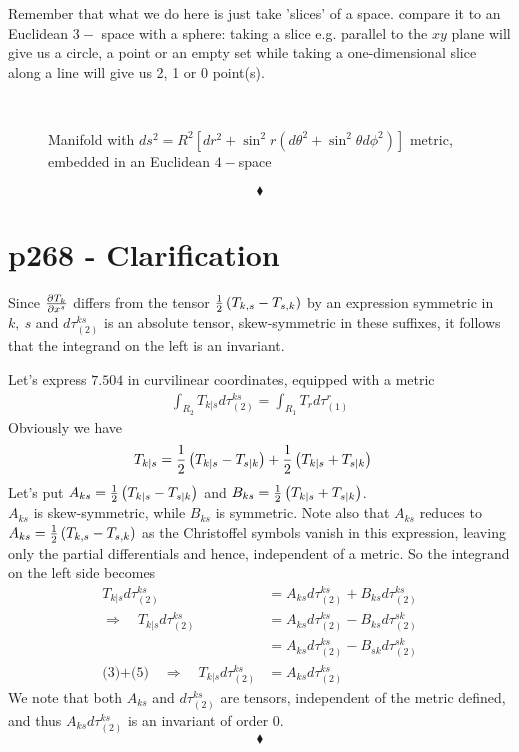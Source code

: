 Remember that what we do here is just take 'slices' of a space. compare it to an Euclidean $3-$ space with a sphere: taking a slice e.g. parallel to the $xy$ plane will give us a circle, a point or an empty set while taking a one-dimensional slice along a line will give us 2, 1 or 0 point(s). 

\begin{figure}[H]%
    \centering
    \subfloat[]{}\\
    \subfloat[]{}
\caption{Manifold with $ds^2=R^2\left[dr^2+\sin^2 r\left(d\theta^2+\sin^2\theta d\phi^2\right)\right]$ metric, embedded in an Euclidean $4-$space}
\label{fig:fig_p265}
\end{figure}
$$\blacklozenge$$
\newpage



\section{p268 - Clarification }
\begin{tcolorbox}
Since $\pdv{T_k}{x^s}$ differs from the tensor $\frac{1}{2}\left(T_{k,s}-T_{s,k}\right)$ by an expression symmetric in $k, \ s$ and $d\tau_{(2)}^{ks}$ is an absolute tensor, skew-symmetric in these suffixes, it follows that the integrand on the left is an invariant.
\end{tcolorbox}
Let's express $\mathbf{7.504}$ in curvilinear coordinates, equipped with a metric
\begin{align}
\int_{R_2}T_{k|s}d\tau_{(2)}^{ks} = \int_{R_1}T_{r}d\tau_{(1)}^{r}
\end{align}
Obviously we have 
\begin{align}
T_{k|s}&= \frac{1}{2}\left(T_{k|s}-T_{s|k}\right)+\frac{1}{2}\left(T_{k|s}+T_{s|k}\right)
\end{align}
Let's put $A_{ks}= \frac{1}{2}\left(T_{k|s}-T_{s|k}\right)$ and $B_{ks}= \frac{1}{2}\left(T_{k|s}+T_{s|k}\right)$.\\
$A_{ks}$ is skew-symmetric, while $B_{ks}$ is symmetric.
Note also that $A_{ks}$ reduces to $A_{ks}=\frac{1}{2}\left(T_{k,s}-T_{s,k}\right)$ as the Christoffel symbols vanish in this expression, leaving only the partial differentials and hence, independent of a metric. 
So the integrand  on the left side becomes
\begin{align}
T_{k|s}d\tau_{(2)}^{ks} &= A_{ks}d\tau_{(2)}^{ks}+B_{ks}d\tau_{(2)}^{ks}\\
\Rightarrow\quad T_{k|s}d\tau_{(2)}^{ks} &= A_{ks}d\tau_{(2)}^{ks}-B_{ks}d\tau_{(2)}^{sk}\\
&= A_{ks}d\tau_{(2)}^{ks}-B_{sk}d\tau_{(2)}^{sk}\\
\text{(3)+(5)}\quad\Rightarrow\quad T_{k|s}d\tau_{(2)}^{ks} &= A_{ks}d\tau_{(2)}^{ks}
\end{align}
We note that both $A_{ks}$ and $d\tau_{(2)}^{ks}$ are tensors, independent of the  metric defined, and thus $A_{ks}d\tau_{(2)}^{ks}$ is an invariant of order $0$. 
$$\blacklozenge$$
\newpage


